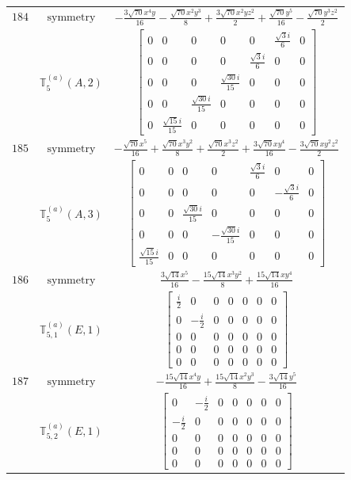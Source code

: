 \documentclass[fleqn,8pt,landscape]{jsarticle}
\begin{document}
\begin{longtable}{ccc}
$ 184 $ & $ \text{symmetry} $ & $ - \frac{3 \sqrt{70} x^{4} y}{16} - \frac{\sqrt{70} x^{2} y^{3}}{8} + \frac{3 \sqrt{70} x^{2} y z^{2}}{2} + \frac{\sqrt{70} y^{5}}{16} - \frac{\sqrt{70} y^{3} z^{2}}{2} $ \\
$  $ & $ \mathbb{T}_{5}^{(a)}(A,2) $ & $ \begin{bmatrix} 0 & 0 & 0 & 0 & 0 & \frac{\sqrt{3} i}{6} & 0 \\ 0 & 0 & 0 & 0 & \frac{\sqrt{3} i}{6} & 0 & 0 \\ 0 & 0 & 0 & \frac{\sqrt{30} i}{15} & 0 & 0 & 0 \\ 0 & 0 & \frac{\sqrt{30} i}{15} & 0 & 0 & 0 & 0 \\ 0 & \frac{\sqrt{15} i}{15} & 0 & 0 & 0 & 0 & 0 \end{bmatrix} $ \\ \hline
$ 185 $ & $ \text{symmetry} $ & $ - \frac{\sqrt{70} x^{5}}{16} + \frac{\sqrt{70} x^{3} y^{2}}{8} + \frac{\sqrt{70} x^{3} z^{2}}{2} + \frac{3 \sqrt{70} x y^{4}}{16} - \frac{3 \sqrt{70} x y^{2} z^{2}}{2} $ \\
$  $ & $ \mathbb{T}_{5}^{(a)}(A,3) $ & $ \begin{bmatrix} 0 & 0 & 0 & 0 & \frac{\sqrt{3} i}{6} & 0 & 0 \\ 0 & 0 & 0 & 0 & 0 & - \frac{\sqrt{3} i}{6} & 0 \\ 0 & 0 & \frac{\sqrt{30} i}{15} & 0 & 0 & 0 & 0 \\ 0 & 0 & 0 & - \frac{\sqrt{30} i}{15} & 0 & 0 & 0 \\ \frac{\sqrt{15} i}{15} & 0 & 0 & 0 & 0 & 0 & 0 \end{bmatrix} $ \\ \hline
$ 186 $ & $ \text{symmetry} $ & $ \frac{3 \sqrt{14} x^{5}}{16} - \frac{15 \sqrt{14} x^{3} y^{2}}{8} + \frac{15 \sqrt{14} x y^{4}}{16} $ \\
$  $ & $ \mathbb{T}_{5,1}^{(a)}(E,1) $ & $ \begin{bmatrix} \frac{i}{2} & 0 & 0 & 0 & 0 & 0 & 0 \\ 0 & - \frac{i}{2} & 0 & 0 & 0 & 0 & 0 \\ 0 & 0 & 0 & 0 & 0 & 0 & 0 \\ 0 & 0 & 0 & 0 & 0 & 0 & 0 \\ 0 & 0 & 0 & 0 & 0 & 0 & 0 \end{bmatrix} $ \\ \hline
$ 187 $ & $ \text{symmetry} $ & $ - \frac{15 \sqrt{14} x^{4} y}{16} + \frac{15 \sqrt{14} x^{2} y^{3}}{8} - \frac{3 \sqrt{14} y^{5}}{16} $ \\
$  $ & $ \mathbb{T}_{5,2}^{(a)}(E,1) $ & $ \begin{bmatrix} 0 & - \frac{i}{2} & 0 & 0 & 0 & 0 & 0 \\ - \frac{i}{2} & 0 & 0 & 0 & 0 & 0 & 0 \\ 0 & 0 & 0 & 0 & 0 & 0 & 0 \\ 0 & 0 & 0 & 0 & 0 & 0 & 0 \\ 0 & 0 & 0 & 0 & 0 & 0 & 0 \end{bmatrix} $ \\ \hline

\end{longtable}
\end{document}
